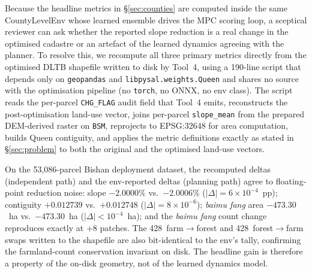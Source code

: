 \documentclass[11pt]{article}
\begin{document}
Because the headline metrics in \S\ref{sec:counties} are computed inside the same CountyLevelEnv whose learned ensemble drives the MPC scoring loop, a sceptical reviewer can ask whether the reported slope reduction is a real change in the optimised cadastre or an artefact of the learned dynamics agreeing with the planner. To resolve this, we recompute all three primary metrics directly from the optimised DLTB shapefile written to disk by Tool~4, using a 190-line script that depends only on \texttt{geopandas} and \texttt{libpysal.weights.Queen} and shares no source with the optimisation pipeline (no \texttt{torch}, no ONNX, no env class). The script reads the per-parcel \texttt{CHG\_FLAG} audit field that Tool~4 emits, reconstructs the post-optimisation land-use vector, joins per-parcel \texttt{slope\_mean} from the prepared DEM-derived raster on \texttt{BSM}, reprojects to EPSG:32648 for area computation, builds Queen contiguity, and applies the metric definitions exactly as stated in \S\ref{sec:problem} to both the original and the optimised land-use vectors.

On the 53{,}086-parcel Bishan deployment dataset, the recomputed deltas (independent path) and the env-reported deltas (planning path) agree to floating-point reduction noise: slope $-2.0000\%$ vs.\ $-2.0006\%$ ($|\Delta|{=}6{\times}10^{-4}$~pp); contiguity $+0.012739$ vs.\ $+0.012748$ ($|\Delta|{=}8{\times}10^{-6}$); \textit{baimu fang} area $-473.30$~ha vs.\ $-473.30$~ha ($|\Delta|{<}10^{-4}$~ha); and the \textit{baimu fang} count change reproduces exactly at $+8$ patches. The 428~farm$\rightarrow$forest and 428~forest$\rightarrow$farm swaps written to the shapefile are also bit-identical to the env's tally, confirming the farmland-count conservation invariant on disk. The headline gain is therefore a property of the on-disk geometry, not of the learned dynamics model.
\end{document}
